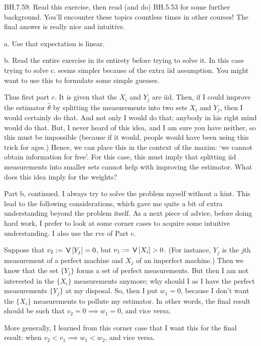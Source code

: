 \setcounter{theorem}{58}
\begin{exercise}
BH.7.59.
Read this exercise, then read (and do) BH.5.53 for some further background.
You'll encounter these topics countless times in other courses!
The final answer is really nice and intuitive.

\begin{hint}
a. Use that expectation is linear.

b. Read the entire exercise in its entirety before trying to solve it. In this case trying to solve c.\/ seems simpler because of the extra iid assumption. You  might want to use this to formulate some simple guesses.

Thus first part c. It is given that the $X_i$ and $Y_j$ are iid. Then, if I could improve the estimator $\hat \theta$ by splitting the measurements into two sets $X_i$ and $Y_j$, then I would certainly do that.
And not only I would do that; anybody in his right mind would do that.
But, I never heard of this idea, and I am sure you have neither, so this must be impossible (because if it would, people would have been using this trick for ages.)
Hence, we can place this in the context of the maxim: `we cannot obtain information for free'.
For this case, this must imply that splitting iid measurements into smaller sets cannot help with improving the estimator. What does this idea imply for the weights?


Part b, continued. I always try to solve the problem myself without a hint. This lead to the following considerations, which gave me quite a bit of extra understanding beyond the problem itself.  As a next piece of advice, before doing hard work, I prefer to look at some corner cases to acquire some intuitive understanding. I also use the rvs of Part c.

Suppose  that $v_2:=\,\mathsf{V}\left[Y_j\right] = 0$, but $v_1 := \,\mathsf{V}\left[X_i\right] > 0$. (For instance, $Y_j$ is the $j$th measurement of a perfect machine and $X_j$ of an imperfect machine.)
Then we know that the set $\{Y_j\}$ forms a set of perfect measurements.
But then I am not interested in the $\{X_i\}$ measurements anymore; why should I as I have the perfect measurements $\{Y_j\}$ at my disposal.
So, then I put $w_1=0$, because I don't want the $\{X_i\}$ measurements to pollute my estimator.
In other words, the final result should be such that $v_2=0 \implies w_{1}=0$, and vice versa.


More generally, I learned from this  corner case that I want this for the final result:  when $v_2<v_{1} \implies w_1 < w_{2}$, and vice versa.


\end{hint}
\end{exercise}
